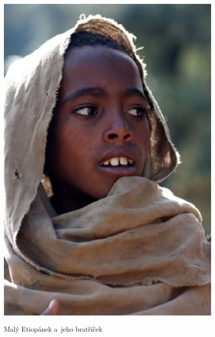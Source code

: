 \documentclass[a4paper, 11pt]{article}
\begin{document}
\begin{figure}[h]
    \centering
    \scalebox{0.4}
        { \includegraphics{etiopan.eps}  }
    \caption{Malý Etiopánek a~jeho bratříček}
    \label{obrazek_1}
\end{figure}
\bigs
\end{document}
